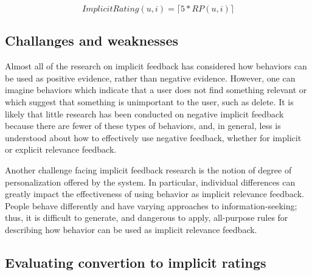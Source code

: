 \begin{equation}
  ImplicitRating(u,i) = \lceil 5 * RP(u,i) \rceil
\end{equation}


\subsection{Challanges and weaknesses}
\label{implicit-weaknesses}

Almost all of the research on implicit feedback has considered how behaviors
can be used as positive evidence, rather than negative evidence. However, one
can imagine behaviors which indicate that a user does not find something
relevant or which suggest that something is unimportant to the user, such as
delete. It is likely that little research has been conducted on negative
implicit feedback because there are fewer of these types of behaviors, and, in
general, less is understood about how to effectively use negative feedback,
whether for implicit or explicit relevance feedback.

Another challenge facing implicit feedback research is the notion of degree of
personalization offered by the system. In particular, individual differences
can greatly impact the effectiveness of using behavior as implicit relevance
feedback. People behave differently and have varying approaches to
information-seeking; thus, it is difficult to generate, and dangerous to apply,
all-purpose rules for describing how behavior can be used as implicit relevance
feedback.



\subsection{Evaluating convertion to implicit ratings}

